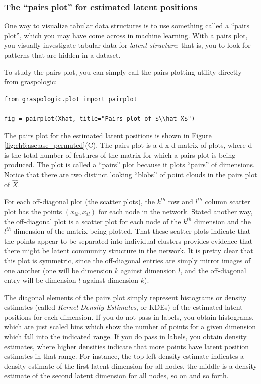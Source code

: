\subsubsection{The ``pairs plot'' for estimated latent positions}
\label{sec:ch6:ase:reorder}
One way to visualize tabular data structures is to use something called a ``pairs plot'', which you may have come across in machine learning. With a pairs plot, you visually investigate tabular data for \textit{latent structure}; that is, you to look for patterns that are hidden in a dataset.

To study the pairs plot, you can simply call the pairs plotting utility directly from graspologic:

\begin{lstlisting}[style=python]
from graspologic.plot import pairplot

fig = pairplot(Xhat, title="Pairs plot of $\\hat X$")
\end{lstlisting}

The pairs plot for the estimated latent positions is shown in Figure \ref{fig:ch6:ase:ase_permuted}(C). The pairs plot is a d x d matrix of plots, where d is the total number of features of the matrix for which a pairs plot is being produced. The plot is called a ``pairs'' plot because it plots “pairs” of dimensions. Notice that there are two distinct looking ``blobs'' of point clouds in the pairs plot of $\hat X$.

For each off-diagonal plot (the scatter plots), the $k^{th}$ row and $l^{th}$ column scatter plot has the points $(x_{ik}, x_{il})$ for each node in the network. Stated another way, the off-diagonal plot is a scatter plot for each node of the $k^{th}$ dimension and the $l^{th}$ dimension of the matrix being plotted. That these scatter plots indicate that the points appear to be separated into individual clusters provides evidence that there might be latent community structure in the network. It is pretty clear that this plot is symmetric, since the off-diagonal entries are simply mirror images of one another (one will be dimension $k$ against dimension $l$, and the off-diagonal entry will be dimension $l$ against dimension $k$).

The diagonal elements of the pairs plot simply represent histograms or density estimates (called \textit{Kernel Density Estimates}, or KDEs) of the estimated latent positions for each dimension. If you do not pass in labels, you obtain histograms, which are just scaled bins which show the number of points for a given dimension which fall into the indicated range. If you do pass in labels, you obtain density estimates, where higher densities indicate that more points have latent position estimates in that range. For instance, the top-left density estimate indicates a density estimate of the first latent dimension for all nodes, the middle is a density estimate of the second latent dimension for all nodes, so on and so forth.

